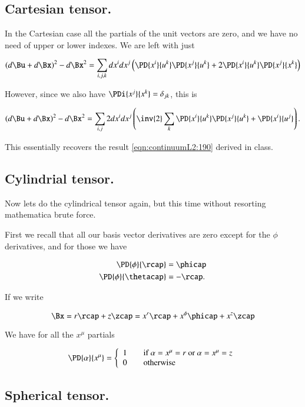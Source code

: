 \subsection{Cartesian tensor.}

In the Cartesian case all the partials of the unit vectors are zero, and we have no need of upper or lower indexes.  We are left with just

\begin{equation}\label{eqn:continuumL2:630}
(d\Bu + d\Bx)^2 - d\Bx^2 
=
\sum_{i, j, k}
dx^i
dx^j
\left( 
\PD{x^i}{u^k} 
\PD{x^j}{u^k} 
+
2
\PD{x^i}{u^k} 
\PD{x^j}{x^k} 
\right)
\end{equation}

However, since we also have $\PDi{x^j}{x^k} = \delta_{jk}$, this is

\begin{equation}\label{eqn:continuumL2:650}
(d\Bu + d\Bx)^2 - d\Bx^2 
=
\sum_{i, j}
2
dx^i
dx^j
\left( 
\inv{2}
\sum_k
\PD{x^i}{u^k} 
\PD{x^j}{u^k} 
+
\PD{x^i}{u^j} 
\right).
\end{equation}

This essentially recovers the result \ref{eqn:continuumL2:190} derived in class.

\subsection{Cylindrial tensor.}

Now lets do the cylindrical tensor again, but this time without resorting mathematica brute force.

First we recall that all our basis vector derivatives are zero except for the $\phi$ derivatives, and for those we have

\begin{align}\label{eqn:continuumL2:670}
\PD{\phi}{\rcap} &= \phicap \\
\PD{\phi}{\thetacap} &= -\rcap.
\end{align}

If we write

\begin{equation}\label{eqn:continuumL2:690}
\Bx = r \rcap + z \zcap = x^r \rcap + x^\phi \phicap + x^z \zcap
\end{equation}

We have for all the $x^\mu$ partials

\begin{equation}\label{eqn:continuumL2:710}
\PD{\alpha}{x^\mu} = 
\left\{
\begin{array}{l l}
1 & \quad \mbox{if $\alpha = x^\mu = r$ or $\alpha = x^\mu = z$} \\
0 & \quad \mbox{otherwise}
\end{array}
\right.
\end{equation}

\subsection{Spherical tensor.}

\EndArticle
